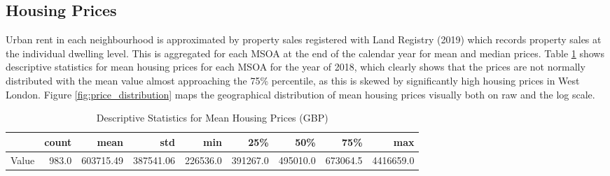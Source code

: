 \documentclass{article}
\begin{document}
\subsection{Housing Prices}
Urban rent in each neighbourhood is approximated by property sales registered with Land Registry (2019) which records property sales at the individual dwelling level. This is aggregated for each MSOA at the end of the calendar year for mean and median prices. Table \ref{table:housing} shows descriptive statistics for mean housing prices for each MSOA for the year of 2018, which clearly shows that the prices are not normally distributed with the mean value almost approaching the 75\% percentile, as this is skewed by significantly high housing prices in West London. Figure \ref{fig:price_distribution} maps the geographical distribution of mean housing prices visually both on raw and the log scale.

\begin{table}[t]
\caption{Descriptive Statistics for Mean Housing Prices (GBP)} 
  \label{table:housing} 
\begin{tabular}{lrrrrrrrr}
\toprule
{} &  count &       mean &        std &       min &       25\% &       50\% &       75\% &        max \\
\midrule
Value &  983.0 &  603715.49 &  387541.06 &  226536.0 &  391267.0 &  495010.0 &  673064.5 &  4416659.0 \\
\bottomrule
\end{tabular}
\end{table}
\end{document}
